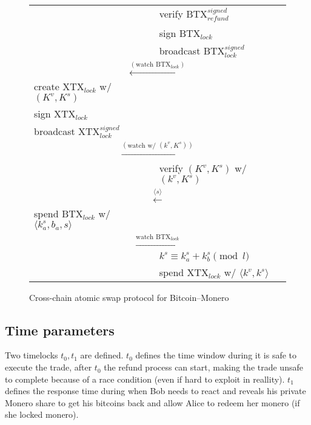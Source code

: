 \documentclass{llncs}
\begin{document}
\begin{figure}[T]
\begin{table}[H]
{\begin{tabular}{ | l l l | }
          & & verify $\text{BTX}_\textit{refund}^\textit{signed}$ \\
          & & sign $\text{BTX}_\textit{lock}$ \\
          & & broadcast $\text{BTX}_\textit{lock}^\textit{signed}$ \\
          \multicolumn{3}{|c|}{$\xleftarrow{(\text{watch BTX}_\textit{lock})}$} \\
          create $\text{XTX}_\textit{lock}$ w/ $(K^v, K^s)$ & & \\
          sign $\text{XTX}_\textit{lock}$ & & \\
          broadcast $\text{XTX}_\textit{lock}^\textit{signed}$ & & \\
          \multicolumn{3}{|c|}{$\xrightarrow{(\text{watch w/ } (k^v, K^s))}$} \\
          & & verify $(K^v, K^s)$ w/ $(k^v, K^s)$ \\
          \multicolumn{3}{|c|}{$\xleftarrow{\langle s \rangle}$} \\
          spend $\text{BTX}_\textit{lock}$ w/ $\langle k^s_a, b_a, s \rangle$ & & \\
          \multicolumn{3}{|c|}{$\xrightarrow{\text{watch BTX}_\textit{lock}}$} \\
          & & $k^s \equiv k^s_a + k^s_b \pmod l$ \\
          & & spend $\text{XTX}_\textit{lock}$ w/ $\langle k^v, k^s \rangle$ \\
        \hline
      \end{tabular}}
    \end{table}
  \caption{Cross-chain atomic swap protocol for Bitcoin--Monero}
  \label{fig:protocol}
\end{figure}

\subsection{Time parameters}
Two timelocks $t_0, t_1$ are defined. $t_0$ defines the time window during it is safe to execute the trade, after $t_0$ the refund process can start, making the trade unsafe to complete because of a race condition (even if hard to exploit in reallity). $t_1$ defines the response time during when Bob needs to react and reveals his private Monero share to get his bitcoins back and allow Alice to redeem her monero (if she locked monero).
\end{document}

